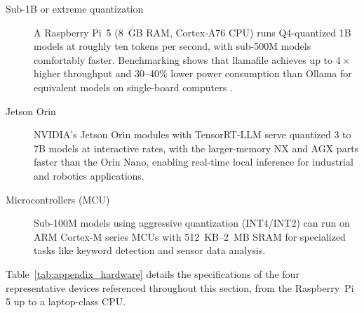 \begin{description}
    \item[Sub-1B or extreme quantization] A Raspberry Pi~5 (8~GB RAM, Cortex-A76 CPU) runs Q4-quantized 1B models at roughly ten tokens per second, with sub-500M models comfortably faster. Benchmarking shows that llamafile achieves up to $4\times$ higher throughput and 30--40\% lower power consumption than Ollama for equivalent models on single-board computers \citep{costa2025sbc}.

    \item[Jetson Orin] NVIDIA's Jetson Orin modules with TensorRT-LLM \citep{nvidia_tensorrt2024} serve quantized 3 to 7B models at interactive rates, with the larger-memory NX and AGX parts faster than the Orin Nano, enabling real-time local inference for industrial and robotics applications.

    \item[Microcontrollers (MCU)] Sub-100M models using aggressive quantization (INT4/INT2) can run on ARM Cortex-M series MCUs with 512~KB--2~MB SRAM for specialized tasks like keyword detection and sensor data analysis.
\end{description}

Table~\ref{tab:appendix_hardware} details the specifications of the four
representative devices referenced throughout this section, from the Raspberry~Pi
5 up to a laptop-class CPU.

\begin{table}[ht]
\centering
\caption{Detailed specifications of the devices referenced in this section.}
\label{tab:appendix_hardware}
\footnotesize{}
\end{table}


